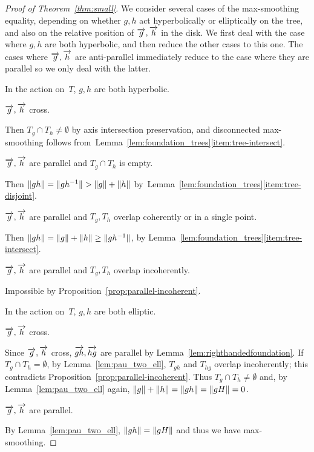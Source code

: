 \begin{proof}[Proof of Theorem~\ref{thm:small}]
  We consider several cases of the max-smoothing equality, depending
  on whether $g,h$ act hyperbolically or elliptically on the tree,
  and also on the relative position of $\overrightarrow{g},\overrightarrow{h}$ in
  the disk. We first deal with the case where $g,h$ are both
  hyperbolic, and then reduce the other cases to this one.
  The cases where $\overrightarrow{g},\overrightarrow{h}$ are anti-parallel immediately
  reduce to the case where they are parallel so we only deal with the
  latter.
\begin{case}
\label{case:hyperbolic}
In the action on~$T$, $g,h$ are both hyperbolic.
\end{case}
\begin{subcase}
$\overrightarrow{g}, \overrightarrow{h}$ cross.
\end{subcase}
Then $T_g \cap T_h \neq \emptyset$ by axis intersection preservation, and disconnected max-smoothing follows from~Lemma~\ref{lem:foundation_trees}\ref{item:tree-intersect}.
\begin{subcase}
$\overrightarrow{g},\overrightarrow{h}$ are parallel and $T_g \cap T_h$ is empty.
\end{subcase}
Then $\lVert gh\rVert=\lVert gh^{-1}\rVert > \lVert g\rVert+\lVert h\rVert$
by~Lemma~\ref{lem:foundation_trees}\ref{item:tree-disjoint}.
\begin{subcase}
$\overrightarrow{g},\overrightarrow{h}$ are parallel and $T_g,T_h$ overlap coherently or in
a single point.
\end{subcase}
    Then $\lVert gh\rVert=\lVert g\rVert+\lVert h\rVert\ge\lVert gh^{-1}\rVert$, by
    Lemma~\ref{lem:foundation_trees}\ref{item:tree-intersect}.
    \begin{subcase}
      $\overrightarrow{g},\overrightarrow{h}$ are parallel and $T_g,T_h$ overlap incoherently.
    \end{subcase}
    Impossible by Proposition~\ref{prop:parallel-incoherent}.

\begin{case}
  In the action on~$T$, $g,h$ are both elliptic.
\end{case}
\begin{subcase}
$\overrightarrow{g},\overrightarrow{h}$ cross.
\end{subcase}
Since $\overrightarrow{g},\overrightarrow{h}$ cross, $\overrightarrow{gh},\overrightarrow{hg}$ are parallel by Lemma~\ref{lem:righthandedfoundation}.
If $T_g \cap T_h = \emptyset$, by Lemma~\ref{lem:pau_two_ell}, $T_{gh}$ and
$T_{hg}$ overlap incoherently; this
contradicts Proposition~\ref{prop:parallel-incoherent}. Thus
$T_g \cap T_h \ne \emptyset$ and, by Lemma~\ref{lem:pau_two_ell} again,
$\lVert g\rVert + \lVert h\rVert = \lVert gh\rVert = \lVert gH\rVert = 0$.
\begin{subcase}
  $\overrightarrow{g}, \overrightarrow{h}$ are parallel. \end{subcase}
By Lemma~\ref{lem:pau_two_ell}, $\lVert gh\rVert = \lVert gH\rVert$ and
thus we have max\hyp smoothing.


\end{proof}
